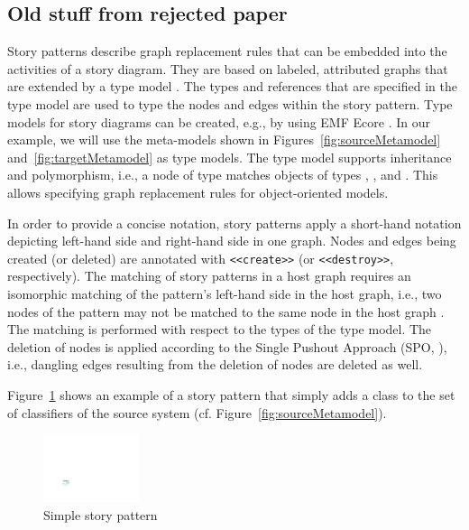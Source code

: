 \subsection*{Old stuff from rejected paper}

Story patterns describe graph replacement rules that can be embedded into the activities of a story diagram. They are based on labeled, attributed graphs that are extended by a type model \cite{FNTZ00}. 
The types and references that are specified in the type model are used to type the nodes and edges within the story pattern.
Type models for story diagrams can be created, e.g., by using EMF Ecore \cite{SBP+08}.
In our example, we will use the meta-models shown in Figures~\ref{fig:sourceMetamodel} and~\ref{fig:targetMetamodel} as type models. The type model supports inheritance and polymorphism, i.e., a node of type  matches objects of types , , and .
This allows specifying graph replacement rules for object-oriented models.

In order to provide a concise notation, story patterns apply a short-hand notation depicting left-hand side and right-hand side in one graph. Nodes and edges being created (or deleted) are annotated with \small \verb|<<create>>| \normalsize (or  {\small \verb|<<destroy>>|\normalsize}, respectively). The matching of story patterns in a host graph requires an isomorphic matching of the pattern's left-hand side in the host graph, i.e., two nodes of the pattern may not be matched to the same node in the host graph \cite{FNTZ00,Roz97}. The matching is performed with respect to the types of the type model. The deletion of nodes is applied according to the Single Pushout Approach (SPO, \cite{Roz97}), i.e., dangling edges resulting from the deletion of nodes are deleted as well.

Figure~\ref{fig:SP} shows an example of a story pattern that simply adds a class to the set of classifiers of the source system (cf. Figure~\ref{fig:sourceMetamodel}).

\begin{figure}[htbp]
\begin{center}
  \includegraphics[width=0.25\textwidth]{figures/StoryPattern}
  \caption{Simple story pattern}
  \label{fig:SP}
\end{center}
\end{figure}